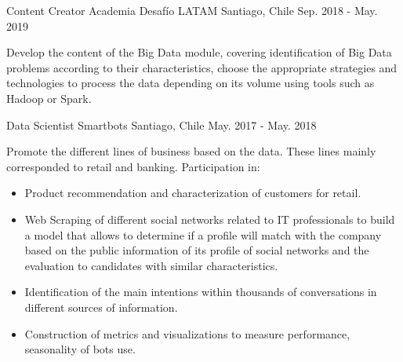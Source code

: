 \begin{cventries}
\cventry
  {Content Creator} %
  {Academia Desafío LATAM} %
  {Santiago, Chile} %
  {Sep. 2018 - May. 2019} %
  {
    \begin{cvitems} %
      \item {Develop the content of the Big Data module, covering identification of Big Data problems according to their characteristics, choose the appropriate strategies and technologies to process the data depending on its volume using tools such as Hadoop or Spark.}
    \end{cvitems}
  }

  \cventry
    {Data Scientist} %
    {Smartbots} %
    {Santiago, Chile} %
    {May. 2017 - May. 2018} %
    {
      \begin{cvitems} %
        \item {Promote the different lines of business based on the data. These lines mainly corresponded to retail and banking. Participation in:}
      	\begin{itemize}
        	\item{Product recommendation and characterization of customers for retail.}
        	\item{Web Scraping of different social networks related to IT professionals to build a model that allows to determine if a profile will match with the company based on the public information of its profile of social networks and the evaluation to candidates with similar characteristics.}
        	\item{Identification of the main intentions within thousands of conversations in different sources of information.}
        	\item{Construction of metrics and visualizations to measure performance, seasonality of bots use.}
      	\end{itemize}
      \end{cvitems}
    }


\end{cventries}

